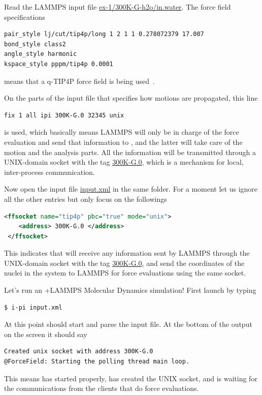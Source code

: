 \documentclass{article}
\begin{document}
\begin{Exercise}[label={basic},title={Molecular Dynamics simulations doing in a different way:  server and clients}]
\Question
Read the LAMMPS input file \url{ex-1/300K-G-h2o/in.water}.
The force field specifications
\begin{lstlisting}[language=bash]
pair_style lj/cut/tip4p/long 1 2 1 1 0.278072379 17.007
bond_style class2 
angle_style harmonic
kspace_style pppm/tip4p 0.0001
\end{lstlisting}
means that a q-TIP4P force field is being used~\cite{habe-mano11pccp}.

On the parts of the input file that specifies how motions are propagated,
this line
\begin{lstlisting}[language=bash]
fix 1 all ipi 300K-G.0 32345 unix
\end{lstlisting}
is used, which basically means LAMMPS will only be in charge of the force evaluation and send that information to \ipi{}, 
and the latter will take care of the motion and the analysis parts.
All the information will be transmitted through a UNIX-domain socket with the tag \url{300K-G.0},
which is a mechanism for local, inter-process communication.

\Question
Now open the \ipi{} input file \url{input.xml} in the same folder.
For a moment let us ignore all the other entries but only focus on the followings
\begin{lstlisting}[language=xml]
 <ffsocket name="tip4p" pbc="true" mode="unix">
    <address> 300K-G.0 </address>
 </ffsocket>
\end{lstlisting}
This indicates that \ipi{} will receive any information sent by LAMMPS through the UNIX-domain socket with the tag \url{300K-G.0},
and send the coordinates of the nuclei in the system to LAMMPS for force evaluations using the same socket.

\Question
Let's run an \ipi{}+LAMMPS Molecular Dynamics simulation!
First launch \ipi{} by typing
\begin{lstlisting}[language=bash]
$ i-pi input.xml
\end{lstlisting}
At this point \ipi{} should start 
and parse the input file. At the bottom of the output on the screen it should say
\begin{lstlisting}[language=bash]
Created unix socket with address 300K-G.0
@ForceField: Starting the polling thread main loop.
\end{lstlisting}
This means \ipi{} has started properly, has created the UNIX socket, and is waiting for the communications from the clients that do force evaluations.


\end{Exercise}
\end{document}
